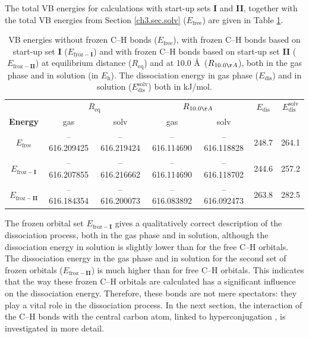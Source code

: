 The total VB energies for calculations with start-up sets \textbf{I} and \textbf{II}, together with the total VB energies from Section \ref{ch3.sec.solv} ($E_\mathrm{free}$) are given in Table \ref{ch3.tab.frozen}. 
\begin{table}[htp]
\center
\caption{VB energies without frozen C--H bonds ($E_\mathrm{free}$), with frozen C--H bonds based on
start-up set \textbf{I} ($E_\mathrm{froz-\textbf{I}}$) and with frozen C--H bonds based on start-up set \textbf{II}
($E_\mathrm{froz-\textbf{II}}$) at equilibrium distance ($R_\mathrm{eq}$) and at 10.0 \AA\ ($R_{10.0 \AA}$),
both in the gas phase and in solution (in $E_\mathrm{h}$). The dissociation energy in gas phase ($E_\mathrm{dis}$) and in solution ($E_\mathrm{dis}^\mathrm{solv}$) both in kJ/mol.}
\center
\begin{tabular}{|c|cc|cc|c|c|}
\hline
&\multicolumn{2}{c|}{$R_\mathrm{eq}$}&\multicolumn{2}{c|}{$R_{10.0 \AA}$} & $E_\mathrm{dis}$ & $E_\mathrm{dis}^\mathrm{solv}$ \\
\textbf{Energy} & gas & solv & gas & solv &&\\
\hline
$E_\mathrm{free}$ & {--616.209425} & {--616.219424} & {--616.114690} & {--616.118828} & 248.7 & 264.1 \\
$E_\mathrm{froz-\textbf{I}}$& {--616.207855} & {--616.216662} & {--616.114690} & {--616.118702} & 244.6 & 257.2 \\
$E_\mathrm{froz-\textbf{II}}$& {--616.184354} & {--616.200073} & {--616.083892} & {--616.092473} & 263.8 & 282.5 \\ \hline
\end{tabular}
\label{ch3.tab.frozen}
\end{table}

The frozen orbital set $E_{\mathrm{froz}-\textbf{I}}$ gives a qualitatively correct description of the dissociation process, both in the gas phase and in solution, although the dissociation energy in solution is slightly lower than for the free C--H orbitals. The dissociation energy in the gas phase and in solution for the second set of frozen orbitals ($E_{\mathrm{froz}-\textbf{II}}$) is much higher than for free C--H orbitals. This indicates that the way these frozen C--H orbitals are calculated has a significant influence on the dissociation energy. Therefore, these bonds are not mere spectators: they play a vital role in the dissociation process. In the next section, the interaction of the C--H bonds with the central carbon atom, linked to hyperconjugation \cite{march,mcmurry}, is investigated in more detail.
 
